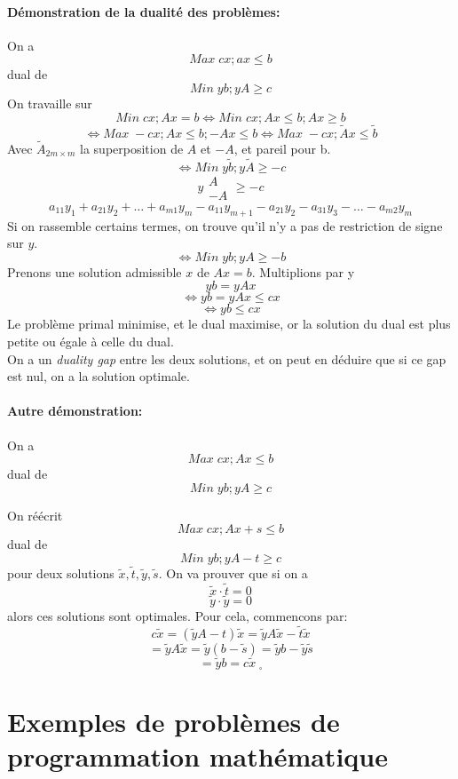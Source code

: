 \documentclass[a4paper]{report}
\theoremstyle{definition}
\theoremstyle{remark}
\theoremstyle{plain}
\begin{document}
\paragraph{Démonstration de la dualité des problèmes:}
On a
\[Max\;cx; ax\le b\]
dual de
\[Min\;yb;yA\ge c\]
On travaille sur
\[Min\;cx; Ax=b\Leftrightarrow Min\;cx; Ax\le b;Ax\ge b\]
\[\Leftrightarrow Max\;-cx; Ax\le b;-Ax\le b\Leftrightarrow Max\;-cx; \tilde
Ax\le \tilde b\] Avec \(\tilde A_{2m\times m}\) la superposition de \(A\) et
\(-A\), et pareil pour b.
\[\Leftrightarrow Min\;y\tilde b;y\tilde A\ge -c\]
\[y\begin{matrix}A\\-A\end{matrix}\ge -c\]
\[a_{11}y_{1}+a_{21}y_2+\dots+a_{m1}y_m-a_{11}y_{m+1}-a_{21}y_2-a_{31}y_3-\dots-a_{m2}y_m\]
Si on rassemble certains termes, on trouve qu'il n'y a pas de restriction de
signe sur \(y\).
\[\Leftrightarrow Min\;yb;yA\ge -b\]
Prenons une solution admissible \(x\) de \(Ax=b\).
Multiplions par y
\[yb=yAx\]
\[\Leftrightarrow yb=yAx\le cx\]
\[\Leftrightarrow yb\le cx\]
Le problème primal minimise, et le dual maximise, or la solution du dual est
plus petite ou égale à celle du dual.\\
On a un \emph{duality gap} entre les deux solutions, et on peut en déduire que
si ce gap est nul, on a la solution optimale.
\paragraph{Autre démonstration:}
On a
\[Max\;cx; Ax\le b\]
dual de
\[Min\;yb;yA\ge c\]

On réécrit
\[Max\;cx; Ax+s\le b\]
dual de
\[Min\;yb;yA-t\ge c\]
pour deux solutions \(\tilde x, \tilde t, \tilde y, \tilde s\).
On va prouver que si on a
\[\tilde x\cdot\tilde t=0\]
\[\tilde y\cdot\tilde y=0\]
alors ces solutions sont optimales.
Pour cela, commencons par:
\[c\tilde x=(\tilde yA-t)\tilde x=\tilde yA\tilde x-\tilde t\tilde x\]
\[=\tilde yA\tilde x=\tilde y(b-\tilde s)=\tilde yb-\tilde y\tilde s\]
\[=\tilde yb=c\tilde x\;_{\square}\]

\section{Exemples de problèmes de programmation mathématique}
\end{document}
